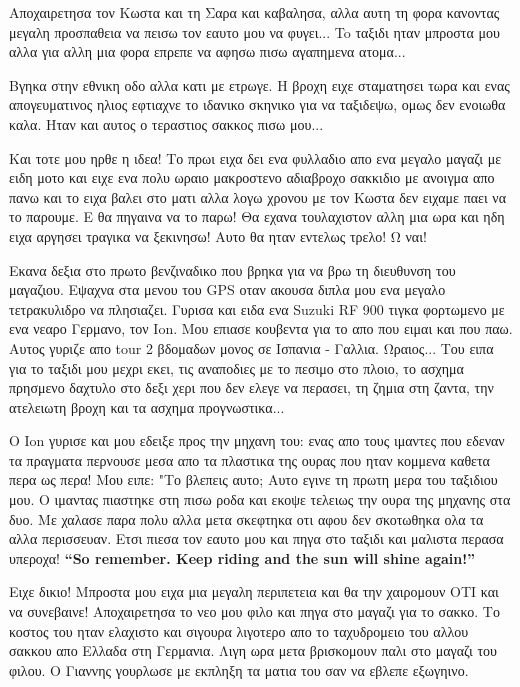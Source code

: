 Αποχαιρετησα τον Κωστα και τη Σαρα και καβαλησα, αλλα αυτη τη φορα κανοντας μεγαλη προσπαθεια να πεισω τον εαυτο μου να φυγει... To ταξιδι ηταν μπροστα μου αλλα για αλλη μια φορα επρεπε να αφησω πισω αγαπημενα ατομα...


Βγηκα στην εθνικη οδο αλλα κατι με ετρωγε. Η βροχη ειχε σταματησει τωρα και ενας απογευματινος ηλιος εφτιαχνε το ιδανικο σκηνικο για να ταξιδεψω, ομως δεν ενοιωθα καλα. Ηταν και αυτος ο τεραστιος σακκος πισω μου...

Και τοτε μου ηρθε η ιδεα! Το πρωι ειχα δει ενα φυλλαδιο απο ενα μεγαλο μαγαζι με ειδη μοτο και ειχε ενα πολυ ωραιο μακροστενο αδιαβροχο σακκιδιο με ανοιγμα απο πανω και το ειχα βαλει στο ματι αλλα λογω χρονου με τον Κωστα δεν ειχαμε παει να το παρουμε.
Ε θα πηγαινα να το παρω! Θα εχανα τουλαχιστον αλλη μια ωρα και ηδη ειχα αργησει τραγικα να ξεκινησω! Αυτο θα ηταν εντελως τρελο! Ω ναι!

Εκανα δεξια στο πρωτο βενζιναδικο που βρηκα για να βρω τη διευθυνση του μαγαζιου. Εψαχνα στα μενου του GPS οταν ακουσα διπλα μου ενα μεγαλο τετρακυλιδρο να πλησιαζει. Γυρισα και ειδα ενα Suzuki RF 900 τιγκα φορτωμενο με ενα νεαρο Γερμανο, τον Ion. Μου επιασε κουβεντα για το απο που ειμαι και που παω. 
Αυτος γυριζε απο tour 2 βδομαδων μονος σε Ισπανια - Γαλλια. Ωραιος...
Του ειπα για το ταξιδι μου μεχρι εκει, τις αναποδιες με το πεσιμο στο πλοιο, το ασχημα πρησμενο δαχτυλο στο δεξι χερι που δεν ελεγε να περασει, τη ζημια στη ζαντα, την ατελειωτη βροχη και τα ασχημα προγνωστικα...

Ο Ion γυρισε και μου εδειξε προς την μηχανη του: ενας απο τους ιμαντες που εδεναν τα πραγματα περνουσε μεσα απο τα πλαστικα της ουρας που ηταν κομμενα καθετα περα ως περα!
Μου ειπε: "Το βλεπεις αυτο; Αυτο εγινε τη πρωτη μερα του ταξιδιου μου. Ο ιμαντας πιαστηκε στη πισω ροδα και εκοψε τελειως την ουρα της μηχανης στα δυο. Με χαλασε παρα πολυ αλλα μετα σκεφτηκα οτι αφου δεν σκοτωθηκα ολα τα αλλα περισσευαν. Ετσι πιεσα τον εαυτο μου και πηγα στο ταξιδι και μαλιστα περασα υπεροχα! \textbf{``So remember. Keep riding and the sun will shine again!''}

Ειχε δικιο! Μπροστα μου ειχα μια μεγαλη περιπετεια και θα την χαιρομουν ΟΤΙ και να συνεβαινε! Αποχαιρετησα το νεο μου φιλο και πηγα στο μαγαζι για το σακκο. Το κοστος του ηταν ελαχιστο και σιγουρα λιγοτερο απο το ταχυδρομειο του αλλου σακκου απο Ελλαδα στη Γερμανια. 
Λιγη ωρα μετα βρισκομουν παλι στο μαγαζι του φιλου. Ο Γιαννης γουρλωσε με εκπληξη τα ματια του σαν να εβλεπε εξωγηινο. 

